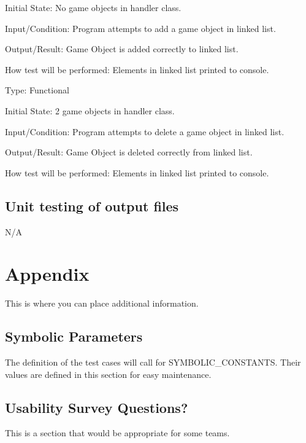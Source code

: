 \documentclass[12pt, titlepage]{article}
\begin{document}
Initial State: No game objects in handler class.

Input/Condition: Program attempts to add a game object in linked list.

Output/Result: Game Object is added correctly to linked list.

How test will be performed: Elements in linked list printed to console.


Type: Functional

Initial State: 2 game objects in handler class.

Input/Condition: Program attempts to delete a game object in linked list.

Output/Result: Game Object is deleted correctly from linked list.

How test will be performed: Elements in linked list printed to console.
		
\subsection{Unit testing of output files}		

N/A





\newpage

\section{Appendix}

This is where you can place additional information.

\subsection{Symbolic Parameters}

The definition of the test cases will call for SYMBOLIC\_CONSTANTS.
Their values are defined in this section for easy maintenance.

\subsection{Usability Survey Questions?}

This is a section that would be appropriate for some teams.
\end{document}
